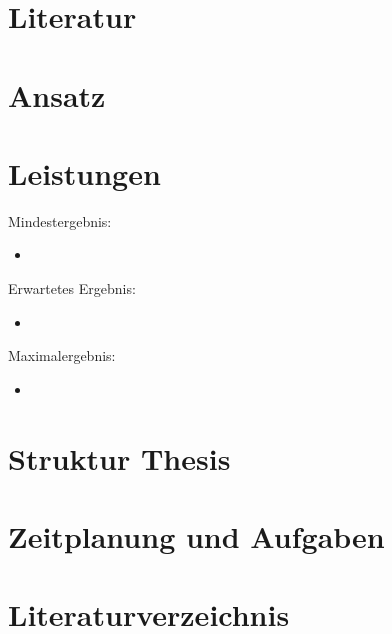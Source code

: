 \documentclass[12pt]{article}
\begin{document}
\section{Literatur}

\section{Ansatz}


\section{Leistungen}
Mindestergebnis:
\begin{itemize}  
\item 
\end{itemize}
Erwartetes Ergebnis:
\begin{itemize}  
\item 
\end{itemize}
Maximalergebnis:
\begin{itemize}  
\item 
\end{itemize}

\newpage{}


\begin{appendix}
\section{Struktur Thesis}

\section{Zeitplanung und Aufgaben}

\end{appendix}
  
\newpage{}
\section{Literaturverzeichnis}

\newpage{}
\end{document}
